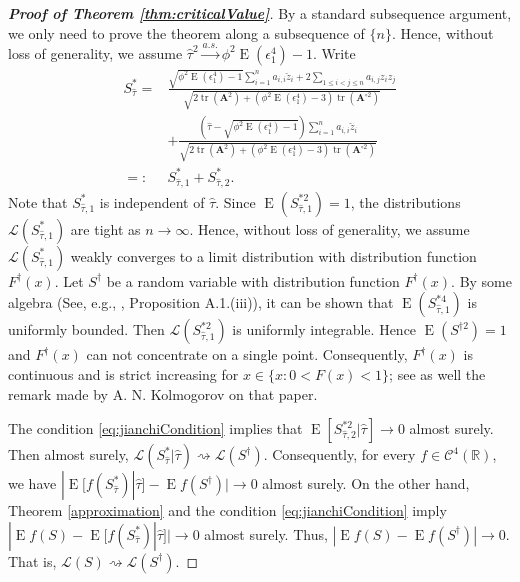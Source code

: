 \documentclass[smallextended]{svjour3}       %
\DeclareMathOperator{\mytr}{tr}
\DeclareMathOperator{\myE}{E}
\newcommand{\BA}{\mathbf{A}}    \newcommand{\BB}{\mathbf{B}}    \newcommand{\BC}{\mathbf{C}}    \newcommand{\BD}{\mathbf{D}}    \newcommand{\BE}{\mathbf{E}}    \newcommand{\BF}{\mathbf{F}}    \newcommand{\BG}{\mathbf{G}}    \newcommand{\BH}{\mathbf{H}}    \newcommand{\BI}{\mathbf{I}}    \newcommand{\BJ}{\mathbf{J}}    \newcommand{\BK}{\mathbf{K}}    \newcommand{\BL}{\mathbf{L}}
\begin{document}
\begin{proof}[\textbf{Proof of Theorem \ref{thm:criticalValue}}]
    By a standard subsequence argument, we only need to prove the theorem along a subsequence of $\{n\}$.
    Hence, without loss of generality, we assume $\hat \tau^2 \xrightarrow{a.s.} \phi^2 \myE (\epsilon_1^4)-1$.
    Write
    \begin{equation*}
        \begin{split}
        S_{\hat \tau}^*
        =&
        \frac{
            \sqrt{\phi^2\myE (\epsilon_1^4)-1} \sum_{i=1}^n  a_{i,i}\check z_i
        +2\sum_{1\leq i <j \leq n} a_{i,j} z_i z_j
    }
    {
            \sqrt{
    2 \mytr(\BA^2)
    +
    (\phi^2\myE (\epsilon_1^4)-3) \mytr(\BA^{\circ 2})
            }             
        }
        \\
        &+
        \frac{
                (\hat \tau -
            \sqrt{
                \phi^2\myE (\epsilon_1^4)-1
            }
        )
             \sum_{i=1}^n  a_{i,i}\check z_i
    }
    {
            \sqrt{
    2 \mytr(\BA^2)
    +
    (\phi^2\myE (\epsilon_1^4)-3) \mytr(\BA^{\circ 2})
            }             
        }
        \\
        =:& S_{\hat \tau,1}^{*} + S_{\hat \tau,2}^{*}
    .
        \end{split}
    \end{equation*}
    Note that $S_{\hat{\tau},1}^*$ is independent of $\hat \tau$.
    Since $\myE ( S_{\hat \tau,1}^{*2} )=1$,  the distributions $\mathcal L(S_{\hat \tau,1}^{*}) $ are tight as $n\to \infty$.
    Hence, without loss of generality, we assume $\mathcal L (S_{\hat \tau,1}^*)$ weakly converges to a limit distribution with distribution function $F^\dagger(x)$.
    Let $S^\dagger$ be a random variable with distribution function $F^\dagger(x)$.
    By some algebra (See, e.g., \cite{chen2010tests}, Proposition A.1.(iii)),
    it can be shown that $\myE (S^{*4}_{\hat \tau,1})$ is uniformly bounded.
    Then $\mathcal L ( S_{\hat \tau,1}^{*2} )$ is  uniformly integrable.
    Hence $\myE(S^{\dagger 2})=1$ and $F^\dagger(x)$ can not concentrate on a single point.
    Consequently, $F^\dagger(x)$ is continuous and is strict increasing for $x\in\{x:0<F(x)<1\}$; see \cite{Sevast1961A} as well the remark made by A. N. Kolmogorov on that paper.

    The condition \eqref{eq:jianchiCondition} implies that $\myE[S_{\hat \tau,2}^{*2}|\hat \tau]\to 0$ almost surely.
    Then almost surely, $\mathcal L (S^*_{\hat \tau}|\hat \tau) \rightsquigarrow \mathcal L(S^\dagger)$.
    Consequently, for every $f\in \mathscr C^4 (\mathbb R)$,
    we have $| \myE [f(S^*_{\hat \tau}) |\hat\tau] - \myE f(S^\dagger) |\to 0$ almost surely.
    On the other hand, Theorem \ref{approximation} and the condition \eqref{eq:jianchiCondition} imply
        $|\myE f(S)- \myE [f(S^*_{\hat \tau})|\hat\tau] |\to 0$ almost surely.
        Thus, $|\myE f(S)- \myE f(S^\dagger) |\to 0$.
        That is, $\mathcal L (S)\rightsquigarrow \mathcal L (S^\dagger)$.


\end{proof}
\end{document}

